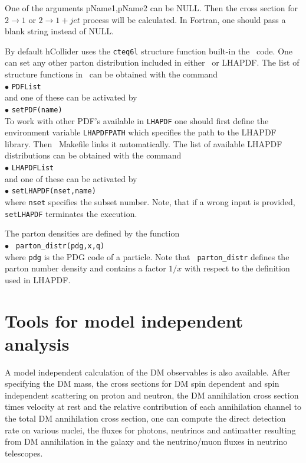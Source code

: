 \documentclass[12pt,a4paper]{article}
\begin{document}
{  One of the arguments pName1,pName2 can be NULL. Then the cross section for $2\to1$   or $2\to1 + jet $
process will be calculated. In Fortran,  one should pass
a blank string instead of NULL. 

By default hCollider uses the {\tt cteq6l} structure function built-in
the \micro\ code. One can set any other parton distribution included in
either \micro\ or LHAPDF.  The list  of structure functions in \micro\ can be
obtained with the command \\
$\bullet$ \verb|PDFList| \\
and one of these can be activated by\\ 
$\bullet$ \verb|setPDF(name)|\\
To work with other PDF's available in {\tt LHAPDF}  one should first define the environment
variable {\tt LHAPDFPATH}  which specifies the path to the LHAPDF library. Then
\micro\ Makefile  links it automatically. The list of available LHAPDF
distributions can be obtained with the command\\
$\bullet$ \verb|LHAPDFList|\\
and one of these can be activated by \\
$\bullet$ \verb|setLHAPDF(nset,name)|\\
where {\tt nset} specifies the subset number. Note, that if a wrong input is provided, 
\verb|setLHAPDF| terminates the execution.

\noindent
The parton densities are  defined  by the function \\
$\bullet$ \verb| parton_distr(pdg,x,q)|\\
where {\tt pdg} is the PDG code of a particle. Note that \verb| parton_distr| defines the parton number density and  
contains a factor $1/x$  with respect to the  definition used in LHAPDF.  

 
\section{Tools for model independent analysis}

A model independent calculation of the DM observables is also available.
After specifying the DM mass, the cross sections for DM  spin dependent and  spin independent scattering on proton and neutron, the DM annihilation cross section times velocity at rest and the relative contribution of  each annihilation channel to the total DM annihilation cross section, one can compute the direct detection rate on   various nuclei, the fluxes for photons, neutrinos and antimatter resulting from DM annihilation in the galaxy and the neutrino/muon fluxes in neutrino telescopes.  

}
\end{document}
